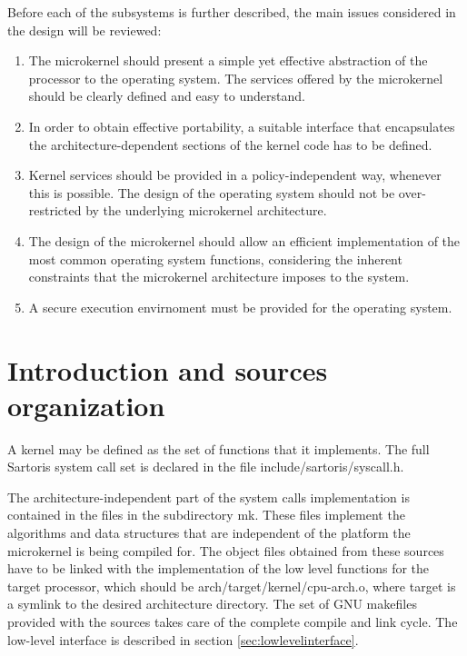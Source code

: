 \documentclass[11pt, letterpaper, twoside, english]{book}
\begin{document}
\noindent{}Before each of the subsystems is further described, the main issues considered in the design will be reviewed:
\begin{enumerate}
\item[] The microkernel should present a simple yet effective abstraction of the processor to the operating system. The services offered by the microkernel should be clearly defined and easy to understand.
\item[] In order to obtain effective portability, a suitable interface that encapsulates the architecture-dependent sections of the kernel code has to be defined.
\item[] Kernel services should be provided in a policy-independent way, whenever this is possible. The design of the operating system should not be over-restricted by the underlying microkernel architecture.
\item[] The design of the microkernel should allow an efficient implementation of the most common operating system functions, considering the inherent constraints that the microkernel architecture imposes to the system.
\item[] A secure execution envirnoment must be provided for the operating system.
\end{enumerate}

\section{Introduction and sources organization}
A kernel may be defined as the set of functions that it implements. The full Sartoris system call set is declared in the file \textsf{include/sartoris/syscall.h}.

The architecture-independent part of the system calls implementation is contained in the files in the subdirectory \textsf{mk}. These files implement the algorithms and data structures that are independent of the platform the microkernel is being compiled for. The object files obtained from these sources have to be linked with the implementation of the low level functions for the target processor, which should be \textsf{arch/target/kernel/cpu-arch.o}, where \textsf{target} is a symlink to the desired architecture directory. The set of GNU makefiles provided with the sources takes care of the complete compile and link cycle.  The low-level interface is described in section \ref{sec:lowlevelinterface}. 
\end{document}
